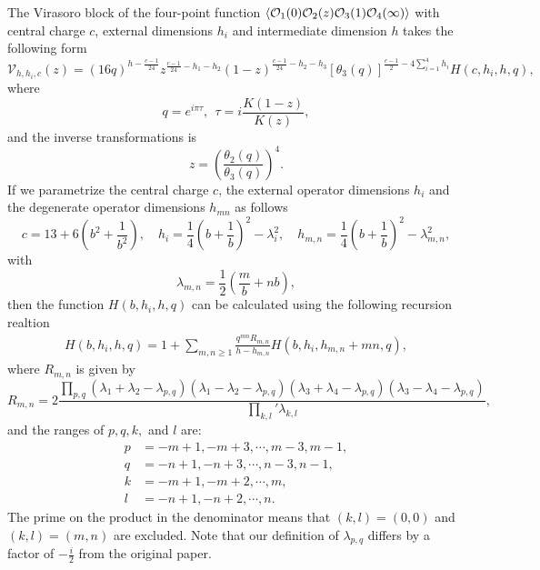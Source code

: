 \documentclass[12pt]{article}
\numberwithin{equation}{section}
\newcommand{\be}{\begin{eqnarray}}
\newcommand{\ee}{\end{eqnarray}}
\newcommand{\CO}{{\cal O}}
\begin{document}
The Virasoro block of the four-point function $\left<\CO_1(0)\CO_2(z)\CO_3(1)\CO_4(\infty)\right>$ with central charge $c$, external dimensions $h_i$ and intermediate dimension $h$ takes the following form
\begin{equation}
\mathcal{V}_{h,h_{i},c}(z)=\left(16q\right)^{h-\frac{c-1}{24}}z^{\frac{c-1}{24}-h_{1}-h_{2}}\left(1-z\right)^{\frac{c-1}{24}-h_{2}-h_{3}}[\theta_{3}\left(q\right)]^{\frac{c-1}{2}-4\sum_{i=1}^{4}h_{i}}H\left(c,h_{i},h,q\right),
\end{equation} \label{eq:blockV}
where 
\begin{equation}
	q=e^{i\pi \tau}, \ \ \tau={i \frac{K(1-z)}{K(z)}},
\end{equation}
and the inverse transformations is 
\begin{equation}
	z=\left(\frac{\theta_2(q)}{\theta_3(q)}\right)^4.
\end{equation}
 If we parametrize the central charge $c$, the external operator dimensions $h_i$ and the degenerate operator dimensions $h_{mn}$ as follows
\begin{equation}
	c=13+6\left(b^2+\frac{1}{b^2}\right),\quad  h_{i}=\frac{1}{4}\left(b+\frac{1}{b}\right)^2-\lambda_i^2,\quad h_{m,n}=\frac{1}{4}\left(b+\frac{1}{b}\right)^2-\lambda_{m,n}^2,
	\end{equation}
with 
\begin{equation}
\lambda_{m,n}=\frac{1}{2}\left(\frac{m}{b}+nb\right),
\end{equation}
then the function $H\left(b,h_i,h,q\right)$ can be calculated using the following recursion realtion
\be \label{eq:recursionH}
H(b,h_i, h, q) = 1 + \sum_{m,n\ge1} \frac{q^{mn} R_{m,n}}{h - h_{m,n}} H(b,h_i, h_{m,n} + mn, q),
\ee
where $R_{m,n}$ is given by 
\begin{equation}\label{eq:Rmn}
R_{m,n}=2\frac{\prod_{p,q}\left(\lambda_1+\lambda_2-\lambda_{p,q}\right)\left(\lambda_1-\lambda_2-\lambda_{p,q}\right)\left(\lambda_3+\lambda_4-\lambda_{p,q}\right)\left(\lambda_3-\lambda_4-\lambda_{p,q}\right)}{\prod_{k,l}'\lambda_{k,l}},
\end{equation}
and the ranges of $p,q,k,$ and $l$ are:
\begin{align*}
p&=-m+1,-m+3,\cdots,m-3,m-1,\\
q&=-n+1,-n+3,\cdots,n-3,n-1,\\
k&=-m+1,-m+2,\cdots,m,\\
l&=-n+1,-n+2,\cdots,n. 
\end{align*}
The prime on the product in the denominator means
that $\left(k,l\right)=\left(0,0\right)$ and $\left(k,l\right)=(m,n)$ are excluded.
Note that our definition of $\lambda_{p,q}$ differs by a factor of $-\frac{i}{2}$
from the original paper.
\end{document}
